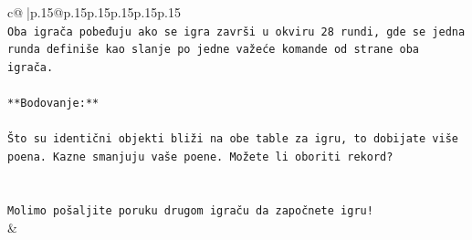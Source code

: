 \documentclass{article}
\begin{document}
{\begin{supertabular}{c@{$\;$}|p{.15\linewidth}@{}p{.15\linewidth}p{.15\linewidth}p{.15\linewidth}p{.15\linewidth}p{.15\linewidth}}
{{{\\ 
\texttt{Oba igrača pobeđuju ako se igra završi u okviru 28 rundi, gde se jedna runda definiše kao slanje po jedne važeće komande od strane oba igrača.} \\
\\ 
\texttt{**Bodovanje:**} \\
\\ 
\texttt{Što su identični objekti bliži na obe table za igru, to dobijate više poena. Kazne smanjuju vaše poene. Možete li oboriti rekord?} \\
\\ 
\\ 
\texttt{Molimo pošaljite poruku drugom igraču da započnete igru!} \\
            }
        }
    }
    & \\ \\


\end{supertabular}}
\end{document}
